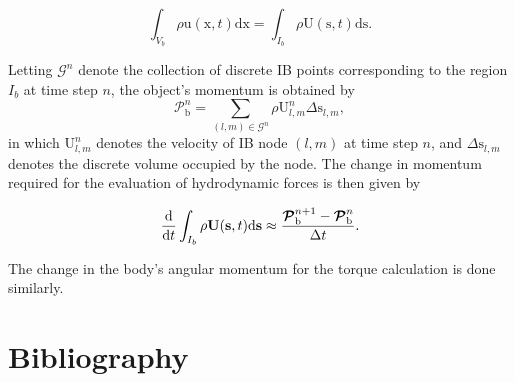 \documentclass[review]{elsarticle}
\renewcommand \d [2]{\frac{{\rm d} #1}{{\rm d} #2}}
\renewcommand{\vec}[1]{\bm{\mathrm{#1}}}
\def \x{\vec{x}}
\def \u{\vec{u}}
\def \U{\vec{U}}
\def \Vb{V_b}
\def \Pb{\vec{\mathcal{P}}_\text{b}}
\def \U{\vec{U}}
\def \cG{\mathcal{G}}
\def \s{\vec{s}}
\def \u{\vec{u}}
\def \x{\vec{x}}
\def \dt{\Delta t}
\def \Ds{{\mathrm d}\s}
\def \Dels{\Delta \vec{s}}
\def \Dx{{\mathrm d}\x}
\def \dt{\Delta t}
\begin{document}
\begin{equation}
 \int_{\Vb} \rho \u(\x,t) \Dx= 
 \int_{I_b} \rho \U(\s,t) \Ds.
\end{equation}

\noindent Letting $\cG^n$ denote the collection of discrete IB points corresponding to the region $I_b$ 
at time step $n$, the object's momentum is obtained by
\begin{equation}
\Pb^n = \sum_{(l,m) \in \cG^{n}} \rho \U_{l,m}^{n} \Dels_{l,m},
\end{equation}
\noindent in which $\U_{l,m}^n$ denotes the velocity of IB node $(l,m)$ at time step $n$,
and $\Dels_{l,m}$ denotes the discrete volume occupied by the node. 
The change in momentum required for the evaluation of hydrodynamic forces is then
given by
  
\begin{equation}
\d{}{t} \int_{I_b} \rho \U(\s,t) \Ds \approx 
\frac{\Pb^{n+1} - \Pb^n}{\dt}.
\end{equation}

\noindent The change in the body's angular momentum for the torque calculation is done similarly.


\section*{Bibliography}
\begin{flushleft}
 
\end{flushleft}
\end{document}
